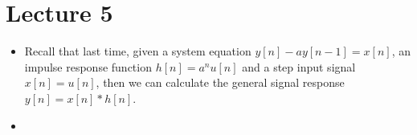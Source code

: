 \section{Lecture 5}
\begin{itemize}
	\item Recall that last time, given a system equation \( y[n] - ay[n - 1] = x[n] \), an 
		impulse response function \( h[n] = a^{n}u[n] \) and a step input signal \( x[n] = u[n] \), then we 
		can calculate the general signal response \( y[n] = x[n] * h[n] \).
	\item {}
\end{itemize}
